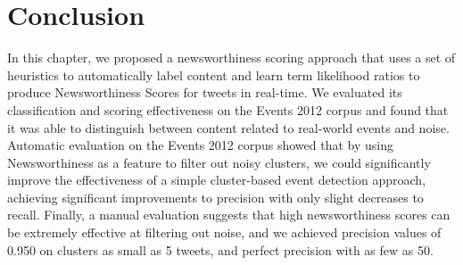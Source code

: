 
\section{Conclusion}
\label{scoring:sec:discussion}

In this chapter, we proposed a newsworthiness scoring approach that uses a set of heuristics to automatically label content and learn term likelihood ratios to produce Newsworthiness Scores for tweets in real-time.
We evaluated its classification and scoring effectiveness on the Events 2012 corpus and found that it was able to distinguish between content related to real-world events and noise.
Automatic evaluation on the Events 2012 corpus showed that by using Newsworthiness as a feature to filter out noisy clusters, we could significantly improve the effectiveness of a simple cluster-based event detection approach, achieving significant improvements to precision with only slight decreases to recall.
Finally, a manual evaluation suggests that high newsworthiness scores can be extremely effective at filtering out noise, and we achieved precision values of 0.950 on clusters as small as 5 tweets, and perfect precision with as few as 50.